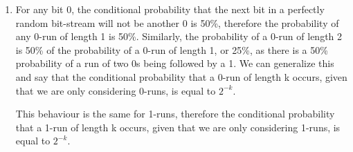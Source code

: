 \begin{enumerate}[wide, label=(A\arabic*)]
\item
For any bit 0, the conditional probability that the next bit in a perfectly random bit-stream will not be another 0 is 50\%, therefore the probability of any 0-run of length 1 is 50\%. Similarly, the probability of a 0-run of length 2 is 50\% of the probability of a 0-run of length 1, or 25\%, as there is a 50\% probability of a run of two 0s being followed by a 1. We can generalize this and say that the conditional probability that a 0-run of length k occurs, given that
we are only considering 0-runs, is equal to $2^{-k}$.

This behaviour is the same for 1-runs, therefore the conditional probability that a 1-run of length k occurs, given that we are only considering 1-runs, is equal to $2^{-k}$.


\end{enumerate}
